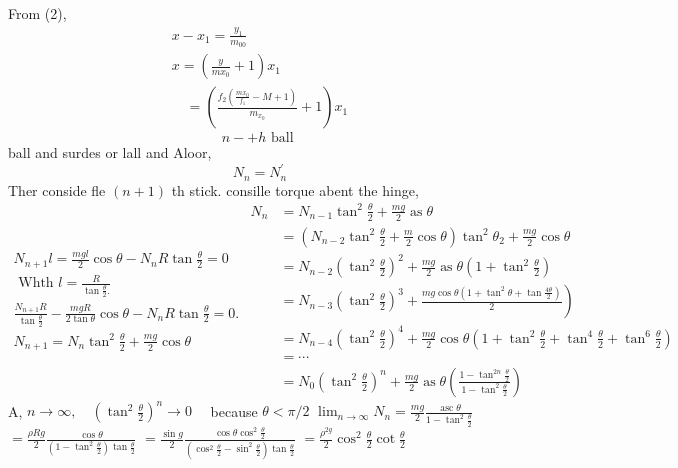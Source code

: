 \documentclass{article}
\begin{document}
From (2),
$$
\begin{array}{l}
	x-x_{1}=\frac{y_{1}}{m_{00}} \\
	x=\left(\frac{y}{m x_{0}}+1\right) x_{1} \\
	\quad=\left(\frac{f_{2}\left(\frac{m x_{0}}{f_{1}}-M+1\right)}{m_{x_{0}}}+1\right) x_{1}
\end{array}
$$$$
n-+h \text { ball }
$$ ball and surdes or lall and Aloor,
$$
N_{n}=N_{n}^{\prime}
$$
Ther conside fle $(n+1)$ th stick.
consille torque abent the hinge,
$$
\begin{array}{l}
	N_{n+1} l=\frac{m g l}{2} \cos \theta-N_{n} R \tan \frac{\theta}{2}=0 \\
	\text { Whth } l=\frac{R}{\tan \frac{\theta}{2} .} \\
	\frac{N_{n+1} R}{\tan \frac{\theta}{2}}-\frac{m g R}{2 \tan \theta} \cos \theta-N_{n} R \tan \frac{\theta}{2}=0 . \\
	N_{n+1}=N_{n} \tan ^{2} \frac{\theta}{2}+\frac{m g}{2} \cos \theta
\end{array}
\begin{aligned}
	N_{n} &=N_{n-1} \tan ^{2} \frac{\theta}{2}+\frac{m g}{2} \operatorname{as} \theta \\
	&=\left(N_{n-2} \tan ^{2} \frac{\theta}{2}+\frac{m}{2} \cos \theta\right) \tan ^{2} \theta_{2}+\frac{m g}{2} \cos \theta \\
	&=N_{n-2}\left(\tan ^{2} \frac{\theta}{2}\right)^{2}+\frac{m g}{2} \operatorname{as} \theta\left(1+\tan ^{2} \frac{\theta}{2}\right) \\
	&\left.=N_{n-3}\left(\tan ^{2} \frac{\theta}{2}\right)^{3}+\frac{m g \cos \theta\left(1+\tan ^{2} \theta+\tan \frac{4 \theta}{2}\right)}{2}\right) \\
	&=N_{n-4}\left(\tan ^{2} \frac{\theta}{2}\right)^{4}+\frac{m g}{2} \cos \theta\left(1+\tan ^{2} \frac{\theta}{2}+\tan ^{4} \frac{\theta}{2}+\tan ^{6} \frac{\theta}{2}\right) \\
	&=\cdots \\
	&=N_{0}\left(\tan ^{2} \frac{\theta}{2}\right)^{n}+\frac{m g}{2} \operatorname{as} \theta\left(\frac{1-\tan ^{2 n} \frac{\theta}{2}}{1-\tan ^{2} \frac{\theta}{2}}\right)
\end{aligned}
$$
A, $n \rightarrow \infty, \quad\left(\tan ^{2} \frac{\theta}{2}\right)^{n} \rightarrow 0 \quad$ because $\theta<\pi / 2$
$\lim _{n \rightarrow \infty} N_{n}=\frac{m g}{2} \frac{\operatorname{asc} \theta}{1-\tan ^{2} \frac{\theta}{2}}$
$=\frac{\rho R g}{2} \frac{\cos \theta}{\left(1-\tan ^{2} \frac{\theta}{2}\right) \tan \frac{\theta}{2}}$
$=\frac{\sin g}{2} \frac{\cos \theta \cos ^{2} \frac{\theta}{2}}{\left(\cos ^{2} \frac{\theta}{2}-\sin ^{2} \frac{\theta}{2}\right) \tan \frac{\theta}{2}}$
$=\frac{\rho^{2 g}}{2} \cos ^{2} \frac{\theta}{2} \cot \frac{\theta}{2}$
\end{document}
